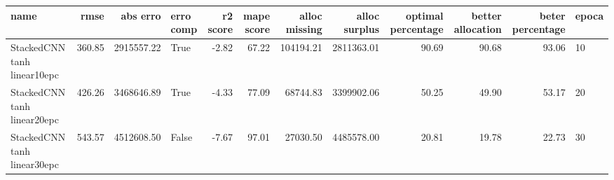 \begin{tabular}{lrrlrrrrrrrl}
\toprule
name & rmse & abs erro & erro comp & r2 score & mape score & alloc missing & alloc surplus & optimal percentage & better allocation & beter percentage & epoca \\
\midrule
StackedCNN tanh linear10epc & 360.85 & 2915557.22 & True & -2.82 & 67.22 & 104194.21 & 2811363.01 & 90.69 & 90.68 & 93.06 & 10 \\
StackedCNN tanh linear20epc & 426.26 & 3468646.89 & True & -4.33 & 77.09 & 68744.83 & 3399902.06 & 50.25 & 49.90 & 53.17 & 20 \\
StackedCNN tanh linear30epc & 543.57 & 4512608.50 & False & -7.67 & 97.01 & 27030.50 & 4485578.00 & 20.81 & 19.78 & 22.73 & 30 \\
\bottomrule
\end{tabular}
